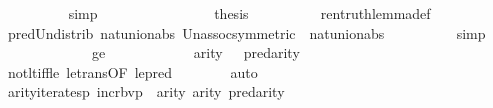 \begin{isabellebody}
\ \ \ \ \ \ \ \ \isamarkupfalse%
\ simp\isanewline
\ \ \ \ \ \ \isamarkupfalse%
\ {\isacartoucheopen}{\isasymphi}{\isasymin}{\isacharunderscore}{\kern0pt}{\isacartoucheclose}\isanewline
\ \ \ \ \ \ \isamarkupfalse%
\ {\isacharquery}{\kern0pt}thesis\isanewline
\ \ \ \ \ \ \ \ \isamarkupfalse%
\ ren{\isacharunderscore}{\kern0pt}truth{\isacharunderscore}{\kern0pt}lemma{\isacharunderscore}{\kern0pt}def\isanewline
\ \ \ \ \ \ \ \ \isamarkupfalse%
\ pred{\isacharunderscore}{\kern0pt}Un{\isacharunderscore}{\kern0pt}distrib\ nat{\isacharunderscore}{\kern0pt}union{\isacharunderscore}{\kern0pt}abs{}\ Un{\isacharunderscore}{\kern0pt}assoc{\isacharbrackleft}{\kern0pt}symmetric{\isacharbrackright}{\kern0pt}\ \ nat{\isacharunderscore}{\kern0pt}union{\isacharunderscore}{\kern0pt}abs{}\isanewline
\ \ \ \ \ \ \ \ \isamarkupfalse%
\ simp\isanewline
\ \ \ \ \isamarkupfalse%
\isanewline
\ \ \isamarkupfalse%
\isanewline
\ \ \ \ \isamarkupfalse%
\ ge\isanewline
\ \ \ \ \isamarkupfalse%
\ {\isacartoucheopen}{\isasymphi}{\isasymin}{\isacharunderscore}{\kern0pt}{\isacartoucheclose}\isanewline
\ \ \ \ \isamarkupfalse%
\ {\isachardoublequoteopen}arity{\isacharparenleft}{\kern0pt}{\isasymphi}{\isacharparenright}{\kern0pt}\ {\isasymle}\ {}{\isachardoublequoteclose}\ {\isachardoublequoteopen}pred{\isacharcircum}{\kern0pt}{}{\isacharparenleft}{\kern0pt}arity{\isacharparenleft}{\kern0pt}{\isasymphi}{\isacharparenright}{\kern0pt}{\isacharparenright}{\kern0pt}\ {\isasymle}\ {}{\isachardoublequoteclose}\isanewline
\ \ \ \ \ \ \isamarkupfalse%
\ not{\isacharunderscore}{\kern0pt}lt{\isacharunderscore}{\kern0pt}iff{\isacharunderscore}{\kern0pt}le\ le{\isacharunderscore}{\kern0pt}trans{\isacharbrackleft}{\kern0pt}OF\ le{\isacharunderscore}{\kern0pt}pred{\isacharbrackright}{\kern0pt}\isanewline
\ \ \ \ \ \ \isamarkupfalse%
\ auto\isanewline
\ \ \ \ \isamarkupfalse%
\ {\isacartoucheopen}{\isasymphi}{\isasymin}{\isacharunderscore}{\kern0pt}{\isacartoucheclose}\isanewline
\ \ \ \ \isamarkupfalse%
\ {\isachardoublequoteopen}arity{\isacharparenleft}{\kern0pt}iterates{\isacharparenleft}{\kern0pt}{\isasymlambda}p{\isachardot}{\kern0pt}\ incr{\isacharunderscore}{\kern0pt}bv{\isacharparenleft}{\kern0pt}p{\isacharparenright}{\kern0pt}{\isacharbackquote}{\kern0pt}{}{\isacharcomma}{\kern0pt}{}{\isacharcomma}{\kern0pt}{\isasymphi}{\isacharparenright}{\kern0pt}{\isacharparenright}{\kern0pt}\ {\isacharequal}{\kern0pt}\ arity{\isacharparenleft}{\kern0pt}{\isasymphi}{\isacharparenright}{\kern0pt}{\isachardoublequoteclose}\ {\isachardoublequoteopen}arity{\isacharparenleft}{\kern0pt}{\isasymphi}{\isacharparenright}{\kern0pt}{\isasymle}{}{\isachardoublequoteclose}\ {\isachardoublequoteopen}pred{\isacharcircum}{\kern0pt}{}{\isacharparenleft}{\kern0pt}arity{\isacharparenleft}{\kern0pt}{\isasymphi}{\isacharparenright}{\kern0pt}{\isacharparenright}{\kern0pt}\ {\isasymle}\ {}{\isachardoublequoteclose}\isanewline

\end{isabellebody}
